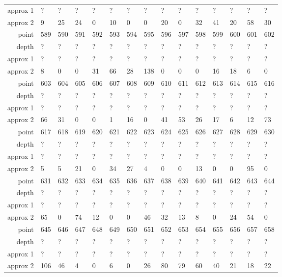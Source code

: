 \begin{center}
\begin{supertabular}{|r|l l l l l l l l l l l l l l|}
approx 1 & ? & ? & ? & ? & ? & ? & ? & ? & ? & ? & ? & ? & ? & ? \\
approx 2 & 9 & 25 & 24 & 0 & 10 & 0 & 0 & 20 & 0 & 32 & 41 & 20 & 58 & 30 \\
\hline
point & 589 & 590 & 591 & 592 & 593 & 594 & 595 & 596 & 597 & 598 & 599 & 600 & 601 & 602 \\
\hline
depth & ? & ? & ? & ? & ? & ? & ? & ? & ? & ? & ? & ? & ? & ? \\
approx 1 & ? & ? & ? & ? & ? & ? & ? & ? & ? & ? & ? & ? & ? & ? \\
approx 2 & 8 & 0 & 0 & 31 & 66 & 28 & 138 & 0 & 0 & 0 & 16 & 18 & 6 & 0 \\
\hline
point & 603 & 604 & 605 & 606 & 607 & 608 & 609 & 610 & 611 & 612 & 613 & 614 & 615 & 616 \\
\hline
depth & ? & ? & ? & ? & ? & ? & ? & ? & ? & ? & ? & ? & ? & ? \\
approx 1 & ? & ? & ? & ? & ? & ? & ? & ? & ? & ? & ? & ? & ? & ? \\
approx 2 & 66 & 31 & 0 & 0 & 1 & 16 & 0 & 41 & 53 & 26 & 17 & 6 & 12 & 73 \\
\hline
point & 617 & 618 & 619 & 620 & 621 & 622 & 623 & 624 & 625 & 626 & 627 & 628 & 629 & 630 \\
\hline
depth & ? & ? & ? & ? & ? & ? & ? & ? & ? & ? & ? & ? & ? & ? \\
approx 1 & ? & ? & ? & ? & ? & ? & ? & ? & ? & ? & ? & ? & ? & ? \\
approx 2 & 5 & 5 & 21 & 0 & 34 & 27 & 4 & 0 & 0 & 13 & 0 & 0 & 95 & 0 \\
\hline
point & 631 & 632 & 633 & 634 & 635 & 636 & 637 & 638 & 639 & 640 & 641 & 642 & 643 & 644 \\
\hline
depth & ? & ? & ? & ? & ? & ? & ? & ? & ? & ? & ? & ? & ? & ? \\
approx 1 & ? & ? & ? & ? & ? & ? & ? & ? & ? & ? & ? & ? & ? & ? \\
approx 2 & 65 & 0 & 74 & 12 & 0 & 0 & 46 & 32 & 13 & 8 & 0 & 24 & 54 & 0 \\
\hline
point & 645 & 646 & 647 & 648 & 649 & 650 & 651 & 652 & 653 & 654 & 655 & 656 & 657 & 658 \\
\hline
depth & ? & ? & ? & ? & ? & ? & ? & ? & ? & ? & ? & ? & ? & ? \\
approx 1 & ? & ? & ? & ? & ? & ? & ? & ? & ? & ? & ? & ? & ? & ? \\
approx 2 & 106 & 46 & 4 & 0 & 6 & 0 & 26 & 80 & 79 & 60 & 40 & 21 & 18 & 22 \\

\end{supertabular}
\end{center}
